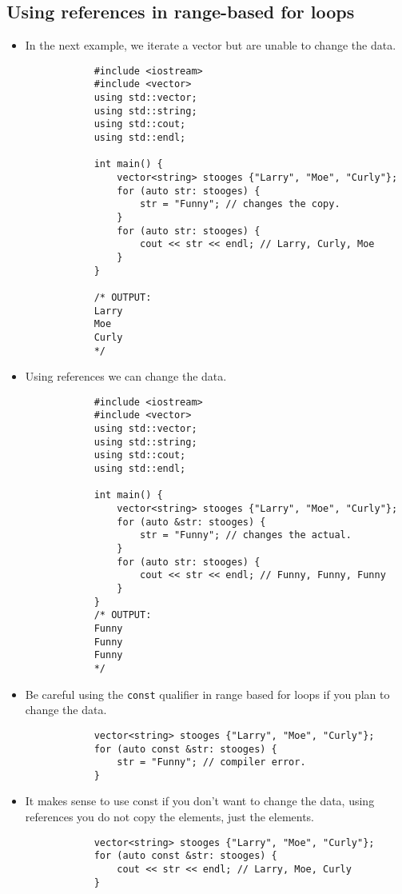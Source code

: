 \subsection{Using references in range-based for loops}
\begin{itemize}
    \item In the next example, we iterate a vector but are unable to change the data.
        \begin{verbatim}
            #include <iostream>
            #include <vector>
            using std::vector;
            using std::string;
            using std::cout;
            using std::endl;
        
            int main() {
                vector<string> stooges {"Larry", "Moe", "Curly"};
                for (auto str: stooges) {
                    str = "Funny"; // changes the copy.
                }
                for (auto str: stooges) {
                    cout << str << endl; // Larry, Curly, Moe
                }
            }
        
            /* OUTPUT:
            Larry
            Moe
            Curly
            */
        \end{verbatim}
    
    \item Using references we can change the data.
        \begin{verbatim}
            #include <iostream>
            #include <vector>
            using std::vector;
            using std::string;
            using std::cout;
            using std::endl;

            int main() {
                vector<string> stooges {"Larry", "Moe", "Curly"};
                for (auto &str: stooges) {
                    str = "Funny"; // changes the actual.
                }
                for (auto str: stooges) {
                    cout << str << endl; // Funny, Funny, Funny
                }
            }
            /* OUTPUT:
            Funny
            Funny
            Funny
            */
        \end{verbatim}
    
    \item Be careful using the \texttt{const} qualifier in range based for loops if you plan to change the data.
        \begin{verbatim}
            vector<string> stooges {"Larry", "Moe", "Curly"};
            for (auto const &str: stooges) {
                str = "Funny"; // compiler error.
            }
        \end{verbatim}
    
    \item It makes sense to use const if you don't want to change the data, using references you do not copy the elements, just the elements.
        \begin{verbatim}
            vector<string> stooges {"Larry", "Moe", "Curly"};
            for (auto const &str: stooges) {
                cout << str << endl; // Larry, Moe, Curly
            }
        \end{verbatim}
\end{itemize}

